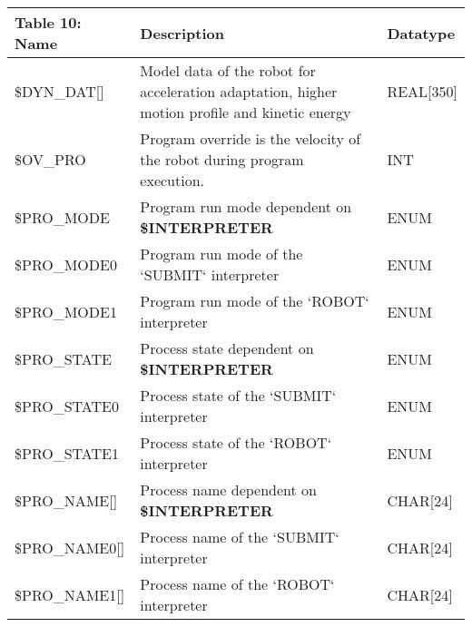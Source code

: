 \begin{appendices}
        \newpage
        \begin{tabular}{|p{}|p{}|p{}|}
        \hline
        \textbf{Table 10: Name} & \textbf{Description} & \textbf{Datatype} \\ \hline
        \$DYN\_DAT[] & Model data of the robot for acceleration adaptation, higher motion profile and kinetic energy & REAL[350] \\ \hline
        \$OV\_PRO & Program override is the velocity of the robot during program execution. & INT \\ \hline
        \$PRO\_MODE & Program run mode dependent on \textbf{\$INTERPRETER} & ENUM \\ \hline
        \$PRO\_MODE0 & Program run mode of the `SUBMIT` interpreter & ENUM \\ \hline
        \$PRO\_MODE1 & Program run mode of the `ROBOT` interpreter & ENUM \\ \hline
        \$PRO\_STATE & Process state dependent on \textbf{\$INTERPRETER} & ENUM \\ \hline
        \$PRO\_STATE0 & Process state of the `SUBMIT` interpreter & ENUM \\ \hline
        \$PRO\_STATE1 & Process state of the `ROBOT` interpreter & ENUM \\ \hline
        \$PRO\_NAME[] & Process name dependent on \textbf{\$INTERPRETER} & CHAR[24] \\ \hline
        \$PRO\_NAME0[] & Process name of the `SUBMIT` interpreter & CHAR[24] \\ \hline
        \$PRO\_NAME1[] & Process name of the `ROBOT` interpreter & CHAR[24] \\ \hline
        \end{tabular}
    \end{appendices}